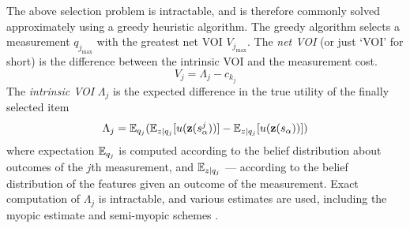 The above selection problem is intractable, and is therefore commonly solved
approximately using a greedy heuristic algorithm. The greedy algorithm
selects a measurement $q_{j_{\max}}$ with the greatest net VOI
$V_{j_{\max}}$. The {\it net VOI} (or just `VOI' for short) is the
difference between the intrinsic VOI and the measurement cost.
\begin{equation}
\label{eq:greedy-net-value}
V_j = \Lambda_j -c_{k_j}
\end{equation}
The {\it intrinsic VOI} $\Lambda_j$ is the expected
difference in the true utility of the finally selected 
item 
\begin{equation}
\label{eq:greedy-intrinsic-value}
\Lambda_j = \mathbb{E}_{q_j}(\mathbb{E}_{z|q_j}[u(\textbf{z}(s_\alpha^j))]-\mathbb{E}_{z|q_j}[u(\textbf{z}(s_\alpha))])
\end{equation}
where expectation $\mathbb{E}_{q_j}$ is computed according to the belief
distribution about outcomes of the $j$th measurement, and
$\mathbb{E}_{z|q_j}$ --- according to the belief distribution of the features
given an outcome of the measurement. Exact computation of $\Lambda_j$
is intractable, and various estimates are used, including the myopic
estimate \cite{Russell.right} and semi-myopic schemes
\cite{TolpinShimony.blinkered}.

